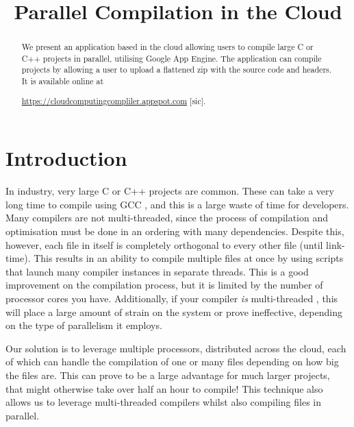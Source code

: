 \documentclass[conference]{IEEEtran}
\begin{document}
\title{Parallel Compilation in the Cloud}

\author{
\and
{}
}

\maketitle

\begin{abstract}
We present an application based in the cloud allowing users to compile large C
or C++ projects in parallel, utilising Google App Engine. The application can
compile projects by allowing a user to upload a flattened zip with the source
code and headers. It is available online at

\noindent\url{https://cloudcomputingcompliler.appspot.com} [sic].

\end{abstract}
\section{Introduction}
In industry, very large C or C++ projects are common. These can take a very long time to compile using GCC \cite{GCC}, and this is a
large waste of time for developers. Many compilers are not multi-threaded,
since the process of compilation and optimisation must be done in an ordering with
many dependencies. Despite this, however, each file in itself is completely
orthogonal to every other file (until link-time). This results in an ability to
compile multiple files at once by using scripts that launch many compiler
instances in separate threads. This is a good improvement on the compilation
process, but it is limited by the number of processor cores you have.
Additionally, if your compiler \emph{is} multi-threaded \cite{rust}, this will
place a large amount of strain on the system or prove ineffective, depending on
the type of parallelism it employs.

Our solution is to leverage multiple processors, distributed across the cloud,
each of which can handle the compilation of one or many files depending on how
big the files are. This can prove to be a large advantage for much larger
projects, that might otherwise take over half an hour to compile! This technique
also allows us to leverage multi-threaded compilers whilst also compiling files
in parallel.
\end{document}
